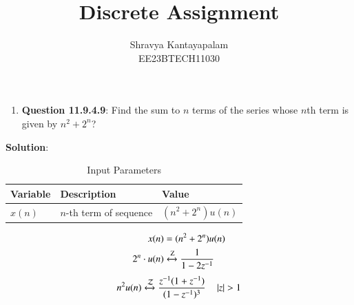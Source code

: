 \documentclass[a4,12pt,onecolumn]{IEEEtran}
\begin{document}
\title{Discrete Assignment}
\author{Shravya Kantayapalam\\ EE23BTECH11030}
\maketitle

\begin{enumerate}
    \item \textbf{Question 11.9.4.9}:
    Find the sum to $n$ terms of the series whose $n$th term is given by $n^2 + 2^n$?
 \end{enumerate}  
    \textbf{Solution}:
   

\begin{table}[htbp]
    \centering
    \caption{Input Parameters}
    \begin{tabular}{|l|l|l|}
    \hline
    \textbf{Variable} & \textbf{Description} & \textbf{Value} \\
    \hline
    \( x(n) \) & \( n \)-th term of sequence & \( (n^2 + 2^n)u(n) \) \\
    \hline
    \end{tabular}
\end{table}
\begin{align}
x(n)&=(n^2+2^n)u(n)\\
2^n \cdot u(n) &\xleftrightarrow{\text{Z}} \frac{1}{1 - 2z^{-1}} \\
\end{align}
\begin{equation}   
   n^2u(n) \xleftrightarrow{\mathcal{Z}} \frac{z^{-1}(1+z^{-1})}{(1-z^{-1})^3} \quad \left\vert z\right\vert>1 \\ 
\end{equation}  
\end{document}
